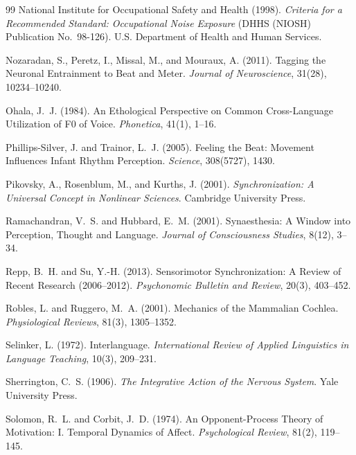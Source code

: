 \documentclass[11pt]{article}
\theoremstyle{plain}
\theoremstyle{definition}
\begin{document}
\begin{thebibliography}{99}
National Institute for Occupational Safety and Health (1998).
\textit{Criteria for a Recommended Standard: Occupational Noise Exposure} (DHHS (NIOSH) Publication No.\ 98-126).
U.S. Department of Health and Human Services.

Nozaradan, S., Peretz, I., Missal, M., and Mouraux, A. (2011).
Tagging the Neuronal Entrainment to Beat and Meter.
\textit{Journal of Neuroscience}, 31(28), 10234--10240.

Ohala, J.~J. (1984).
An Ethological Perspective on Common Cross-Language Utilization of F0 of Voice.
\textit{Phonetica}, 41(1), 1--16.

Phillips-Silver, J. and Trainor, L.~J. (2005).
Feeling the Beat: Movement Influences Infant Rhythm Perception.
\textit{Science}, 308(5727), 1430.

Pikovsky, A., Rosenblum, M., and Kurths, J. (2001).
\textit{Synchronization: A Universal Concept in Nonlinear Sciences}.
Cambridge University Press.

Ramachandran, V.~S. and Hubbard, E.~M. (2001).
Synaesthesia: A Window into Perception, Thought and Language.
\textit{Journal of Consciousness Studies}, 8(12), 3--34.

Repp, B.~H. and Su, Y.-H. (2013).
Sensorimotor Synchronization: A Review of Recent Research (2006--2012).
\textit{Psychonomic Bulletin and Review}, 20(3), 403--452.

Robles, L. and Ruggero, M.~A. (2001).
Mechanics of the Mammalian Cochlea.
\textit{Physiological Reviews}, 81(3), 1305--1352.

Selinker, L. (1972).
Interlanguage.
\textit{International Review of Applied Linguistics in Language Teaching}, 10(3), 209--231.

Sherrington, C.~S. (1906).
\textit{The Integrative Action of the Nervous System}.
Yale University Press.

Solomon, R.~L. and Corbit, J.~D. (1974).
An Opponent-Process Theory of Motivation: I. Temporal Dynamics of Affect.
\textit{Psychological Review}, 81(2), 119--145.


\end{thebibliography}
\end{document}
